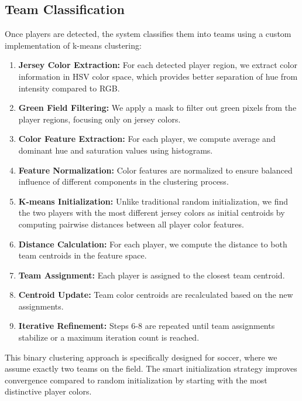 \documentclass[10pt,twocolumn,letterpaper]{article}
\begin{document}
\subsection{Team Classification}

Once players are detected, the system classifies them into teams using a custom implementation of k-means clustering:

\begin{enumerate}
    \item \textbf{Jersey Color Extraction:} For each detected player region, we extract color information in HSV color space, which provides better separation of hue from intensity compared to RGB.
    
    \item \textbf{Green Field Filtering:} We apply a mask to filter out green pixels from the player regions, focusing only on jersey colors.
    
    \item \textbf{Color Feature Extraction:} For each player, we compute average and dominant hue and saturation values using histograms.
    
    \item \textbf{Feature Normalization:} Color features are normalized to ensure balanced influence of different components in the clustering process.
    
    \item \textbf{K-means Initialization:} Unlike traditional random initialization, we find the two players with the most different jersey colors as initial centroids by computing pairwise distances between all player color features.
    
    \item \textbf{Distance Calculation:} For each player, we compute the distance to both team centroids in the feature space.
    
    \item \textbf{Team Assignment:} Each player is assigned to the closest team centroid.
    
    \item \textbf{Centroid Update:} Team color centroids are recalculated based on the new assignments.
    
    \item \textbf{Iterative Refinement:} Steps 6-8 are repeated until team assignments stabilize or a maximum iteration count is reached.
\end{enumerate}

This binary clustering approach is specifically designed for soccer, where we assume exactly two teams on the field. The smart initialization strategy improves convergence compared to random initialization by starting with the most distinctive player colors.
\end{document}
